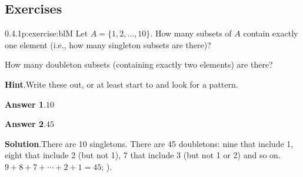 \documentclass[twoside,11pt,]{book}
\newcommand{\blocktitlefont}{\relax}
\numberwithin{equation}{chapter}
\begin{document}
\subsection*{Exercises}
\begin{divisionsolution}{0.4.1}{}{p:exercise:blM}%
Let \(A = \{1,2,\ldots, 10\}\text{.}\) How many subsets of \(A\) contain exactly one element (i.e., how many singleton subsets are there)?%
\par
How many doubleton subsets (containing exactly two elements) are there?%
\par\smallskip%
\noindent\textbf{\blocktitlefont Hint}.\quad{}Write these out, or at least start to and look for a pattern.%
\par\smallskip%
\noindent\textbf{\blocktitlefont Answer 1}.\quad{}\(10\)%
\par\smallskip%
\noindent\textbf{\blocktitlefont Answer 2}.\quad{}\(45\)%
\par\smallskip%
\noindent\textbf{\blocktitlefont Solution}.\quad{}There are 10 singletons. There are 45 doubletons: nine that include 1, eight that include 2 (but not 1), 7 that include 3 (but not 1 or 2) and so on. \(9+8+7+\cdots+2+1 = 45\text{;}\) ).%
\end{divisionsolution}%
\end{document}
